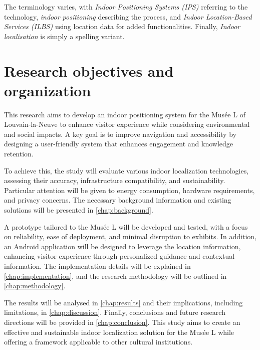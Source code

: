The terminology varies, with \textit{Indoor Positioning Systems (IPS)} referring to the technology, \textit{indoor positioning} describing the process, and \textit{Indoor Location-Based Services (ILBS)} using location data for added functionalities. Finally, \textit{Indoor localisation} is simply a spelling variant. 

\section{Research objectives and organization}



This research aims to develop an indoor positioning system for the Musée L of Louvain-la-Neuve to enhance visitor experience while considering environmental and social impacts. A key goal is to improve navigation and accessibility by designing a user-friendly system that enhances engagement and knowledge retention. 

To achieve this, the study will evaluate various indoor localization technologies, assessing their accuracy, infrastructure compatibility, and sustainability. Particular attention will be given to energy consumption, hardware requirements, and privacy concerns. The necessary background information and existing solutions will be presented in \autoref{chap:background}.

A prototype tailored to the Musée L will be developed and tested, with a focus on reliability, ease of deployment, and minimal disruption to exhibits. In addition, an Android application will be designed to leverage the location information, enhancing visitor experience through personalized guidance and contextual information. The implementation details will be explained in \autoref{chap:implementation}, and the research methodology will be outlined in \autoref{chap:methodology}.

The results will be analysed in \autoref{chap:results} and their implications, including limitations, in \autoref{chap:discussion}. Finally, conclusions and future research directions will be provided in \autoref{chap:conclusion}. This study aims to create an effective and sustainable indoor localization solution for the Musée L while offering a framework applicable to other cultural institutions.
